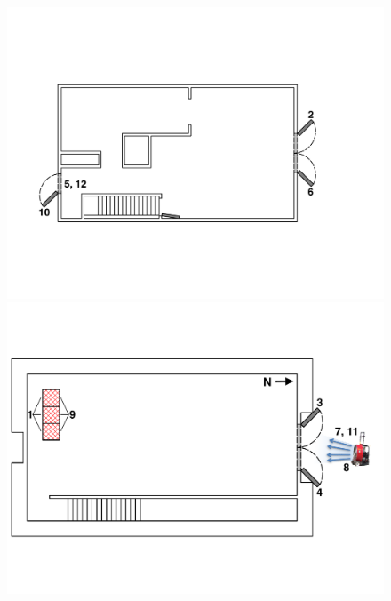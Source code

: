 \begin{figure}[!ht]
\begin{minipage}[b]{0.88\columnwidth}
\begin{center}
\end{center}
\end{minipage}
\begin{minipage}[b]{\columnwidth}
	\vspace{15pt}
	\centering
	\includegraphics[width=\columnwidth]{Figures/Floor_Plans/West_Structure_2nd_Floor_Test_22}
	\includegraphics[width=0.95\columnwidth]{Figures/Floor_Plans/West_Structure_1st_Floor_Test_22}

\end{minipage}
\end{figure}
